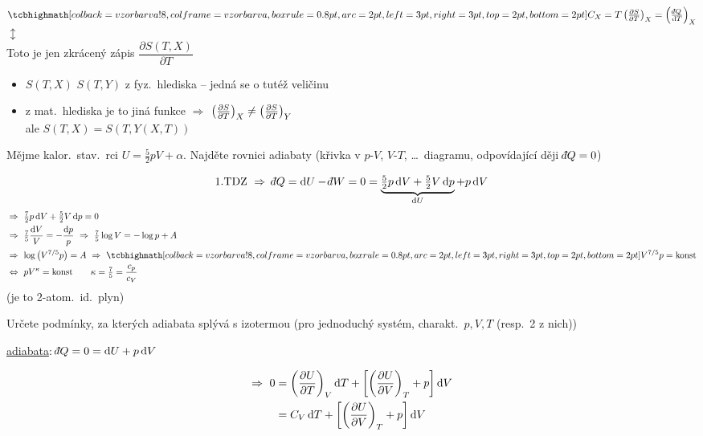 \pozor{!} \quad $\vzorec{C_X = T\left(\pdv{S}{T}\right)_X = \left(\frac{\dbar Q}{\dd T}\right)_X}$ \\
\hspace*{4.3cm} $\updownarrow$ \\
Toto je jen zkrácený zápis \quad $\dfrac{\partial S(T,X)}{\partial T}$
\begin{itemize}[nosep]
  \item $S(T,X)$ \uv{$=$} $S(T,Y)$ \quad z fyz.\ hlediska -- jedná se o tutéž veličinu
  \item z mat.\ hlediska je to jiná funkce $\Rightarrow$ $\left(\pdv{S}{T}\right)_X \neq \left(\pdv{S}{T}\right)_Y$ \\
        ale $S(T,X) = S(T, Y(X,T))$
\end{itemize}

\begin{priklad}
Mějme kalor.\ stav.\ rci $U = \frac52 pV + \alpha$. Najděte rovnici adiabaty (křivka v $p$-$V$, $V$-$T$, \dots\ diagramu, odpovídající ději $\dbar Q = 0$)
\end{priklad}
\[
  \text{1.TDZ}\ \Rightarrow\ \dbar Q = \dd U - \dbar W = 0 = \underbrace{\tfrac52 p\,\dd V + \tfrac52 V\,\dd p}_{\dd U} + p\,\dd V
\]
\begin{align*}
  &\Rightarrow\ \tfrac72 p\,\dd V + \tfrac52 V\,\dd p = 0 \\
  &\Rightarrow\ \tfrac75\frac{\dd V}{V} = -\frac{\dd p}{p}
   \ \Rightarrow\ \tfrac75\log V = -\log p + A \\
  &\Rightarrow\ \log\big(V^{7/5}p\big) = A \ \Rightarrow\ \vzorec{V^{7/5}p = \text{konst}} \\
  &\Leftrightarrow\ pV^\kappa = \text{konst} \qquad \kappa = \tfrac75 = \frac{c_p}{c_V}
\end{align*}
(je to 2-atom.\ id.\ plyn)

\begin{priklad}
Určete podmínky, za kterých adiabata splývá s izotermou (pro jednoduchý systém, charakt.\ $p, V, T$ (resp.\ 2 z nich))
\end{priklad}

\begin{minipage}{0.6\textwidth}
\underline{adiabata}: \quad $\dbar Q = 0 = \dd U + p\,\dd V$
\end{minipage}
\begin{minipage}{0.35\textwidth}
\end{minipage}
\begin{align*}
  \Rightarrow\ 0 &= \left(\pdv{U}{T}\right)_V\dd T + \left[\left(\pdv{U}{V}\right)_T + p\right]\dd V \\
  &= C_V\,\dd T + \left[\left(\pdv{U}{V}\right)_T + p\right]\dd V
\end{align*}

